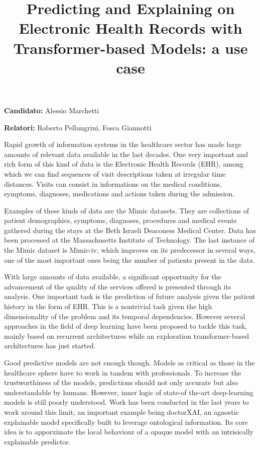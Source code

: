 \documentclass[]{marticle}
\title{\textbf{\huge Predicting and Explaining on Electronic Health Records  with Transformer-based Models: a use case}}
\date{}
\author{}
\begin{document}
\maketitle

\textbf{Candidato:} Alessio Marchetti

\textbf{Relatori:} Roberto Pellungrini, Fosca Giannotti
\vspace{0.4cm}

Rapid growth of information systems in the healthcare sector has made large amounts of relevant data
available in the last decades. One very important and rich form of this kind of data is the
Electronic Health Records (EHR), among which we can find sequences of visit descriptions taken at
irregular time distances. Visits can consist in informations on the medical conditions, symptoms,
diagnoses, medications and actions taken during the admission. 

Examples of these kinds of data are the Mimic datasets. They are collections of patient
demographics, symptoms, diagnoses, procedures and medical events gathered during the stays at the
Beth Israeli Deaconess Medical Center. Data has been processed at the Massachusetts Institute of
Technology. The last instance of the Mimic dataset is Mimic-iv, which improves on its predecessor in
several ways, one of the most important ones being the number of patients present in the data.

With large amounts of data available, a significant opportunity for the advancement of the quality
of the services offered is presented through its analysis. One important task is the prediction of
future analysis given the patient history in the form of EHR. This is a nontrivial task given the
high dimensionality of the problem and its temporal dependencies. However several approaches in the
field of deep learning have been proposed to tackle this task, mainly based on recurrent
architectures while an exploration transformer-based architectures has just started.

Good predictive models are not enough though. Models as critical as those in the healthcare sphere
have to work in tandem with professionals. To increase the trustworthiness of the models,
predictions should not only accurate but also understandable by humans. However, inner logic of
state-of the-art deep-learning models is still poorly understood. Work has been conducted in the
last years to work around this limit, an important example being doctorXAI, an agnostic explainable
model specifically built to leverage ontological information. Its core idea is to apporximate the
local behaviour of a opaque model with an intrisically explainable predictor.
\end{document}
